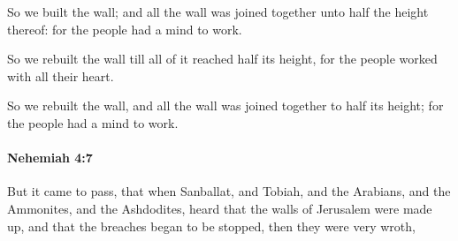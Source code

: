 			\begin{versebox}
					\item[BHS] 
					\item[LXX] 
					\item[ASV] So we built the wall; and all the wall was joined together unto half the height thereof: for the people had a mind to work.
					\item[NIV] So we rebuilt the wall till all of it reached half its height, for the people worked with all their heart.
					\item[NRSV] So we rebuilt the wall, and all the wall was joined together to half its height; for the people had a mind to work.
			\end{versebox}

		\paragraph{Nehemiah 4:7} %
			\label{NEHEMIAH-4-7}

			But it came to pass, that when Sanballat, and Tobiah, and the Arabians, and the Ammonites, and the Ashdodites, heard that the walls of Jerusalem were made up, and that the breaches began to be stopped, then they were very wroth,

